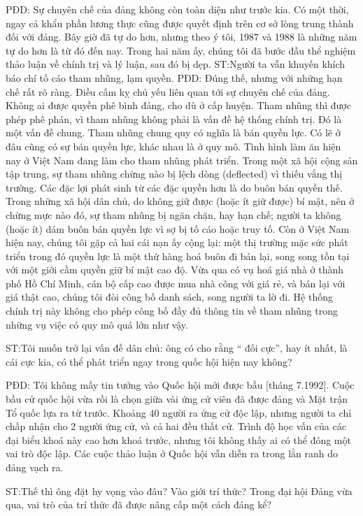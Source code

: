 PĐD: Sự chuyên chế của đảng không còn toàn diện như trước kia. Có một thời, ngay cả khẩu phần lương thực cũng được quyết định trên cơ sở lòng trung thành đối với đảng. Bây giờ đã tự do hơn, nhưng theo ý tôi, 1987 và 1988 là những năm tự do hơn là từ đó đến nay. Trong hai năm ấy, chúng tôi đã bước đầu thể nghiệm thảo luận về chính trị và lý luận, sau đó bị dẹp.
ST:Người ta vẫn khuyến khích báo chí tố cáo tham nhũng, lạm quyền.
PĐD: Đúng thế, nhưng với những hạn chế rất rõ ràng. Điều cấm kỵ chủ yếu liên quan tới sự chuyên chế của đảng. Không ai được quyền phê bình đảng, cho dù ở cấp huyện. Tham nhũng thì được phép phê phán, vì tham nhũng không phải là vấn đề hệ thống chính trị. Đó là một vấn đề chung. Tham nhũng chung quy có nghĩa là bán quyền lực. Có lẽ ở đâu cũng có sự bán quyền lực, khác nhau là ở quy mô. Tình hình làm ăn hiện nay ở Việt Nam đang làm cho tham nhũng phát triển. Trong một xã hội cộng sản tập trung, sự tham nhũng chừng nào bị lệch dòng (deflected) vì thiếu vắng thị trường. Các đặc lợi phát sinh từ các đặc quyền hơn là do buôn bán quyền thế. Trong những xã hội dân chủ, do không giữ được (hoặc ít giữ được) bí mật, nên ở chừng mực nào đó, sự tham nhũng bị ngăn chặn, hay hạn chế; người ta không (hoặc ít) dám buôn bán quyền lực vì sợ bị tố cáo hoặc truy tố. Còn ở Việt Nam hiện nay, chúng tôi gặp cả hai cái nạn ấy cộng lại: một thị trường mặc sức phát triển trong đó quyền lực là một thứ hàng hoá buôn đi bán lại, song song tồn tại với một giới cầm quyền giữ bí mật cao độ. Vừa qua có vụ hoá giá nhà ở thành phố Hồ Chí Minh, cán bộ cấp cao được mua nhà công với giá rẻ, và bán lại với giá thật cao, chúng tôi đòi công bố danh sách, song người ta lờ đi. Hệ thống chính trị này không cho phép công bố đầy đủ thông tin về tham nhũng trong những vụ việc có quy mô quá lớn như vậy.

ST:Tôi muốn trở lại vấn đề dân chủ: ông có cho rằng “ đối cực”, hay ít nhất, là cái cực kia, có thể phát triển ngay trong quốc hội hiện nay không?

PĐD: Tôi không mấy tin tưởng vào Quốc hội mới được bầu [tháng 7.1992]. Cuộc bầu cử quốc hội vừa rồi là chọn giữa vài ứng cử viên đã được đảng và Mặt trận Tổ quốc lựa ra từ trước. Khoảng 40 người ra ứng cử độc lập, nhưng người ta chỉ chấp nhận cho 2 người ứng cử, và cả hai đều thất cử. Trình độ học vấn của các đại biểu khoá này cao hơn khoá trước, nhưng tôi không thấy ai có thể đóng một vai trò độc lập. Các cuộc thảo luận ở Quốc hội vẫn diễn ra trong lằn ranh do đảng vạch ra.

ST:Thế thì ông đặt hy vọng vào đâu? Vào giới trí thức? Trong đại hội Đảng vừa qua, vai trò của trí thức đã được nâng cấp một cách đáng kể?

